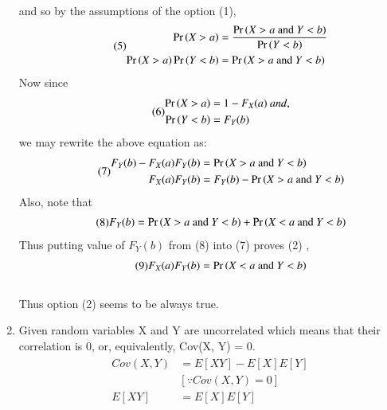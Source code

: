 \documentclass[journal,12pt,twocolumn]{IEEEtran}
\begin{document}
\begin{enumerate}
and so by the assumptions of the option (1),
\begin{align}\tag{5}
    \begin{split}
        \Pr\left(X > a\right) &= \frac{\Pr\left(X > a \mbox{ and } Y < b\right)}{\Pr\left(Y < b\right)}\\
        \Pr\left(X > a\right)\Pr\left(Y < b\right) &= \Pr\left(X > a \mbox{ and } Y < b\right)
    \end{split}
\end{align}
Now since 
\begin{align}\tag{6}
    \begin{split}
        \Pr\left(X > a\right) &= 1 - F_X(a)\ and,\\
        \Pr\left(Y < b\right) &= F_Y(b)
    \end{split}
\end{align}
we may rewrite the above equation as:
\begin{align}\tag{7}
    \begin{split}
        F_Y(b) - F_X(a)F_Y(b) &= \Pr\left(X > a \mbox{ and } Y < b\right)\\
        F_X(a)F_Y(b) &= F_Y(b) - \Pr\left(X > a \mbox{ and } Y < b\right)
    \end{split}
\end{align}
Also, note that 
\begin{align}\tag{8}
    \begin{split}
        F_Y(b) = \Pr\left(X > a \mbox{ and } Y < b\right) + \Pr\left(X < a \mbox{ and } Y < b\right)
    \end{split}
\end{align}
Thus putting value of $F_Y(b)$ from (8) into (7) proves (2) ,
\begin{align}\tag{9}
    \begin{split}
        F_X(a)F_Y(b) &= \Pr\left(X < a \mbox{ and } Y < b\right)\\
    \end{split}
\end{align}\\
Thus option (2) seems to be always true.\\
    \item Given random variables X and Y are uncorrelated which means that their correlation is 0, or, equivalently, Cov(X, Y) = 0.\\
\begin{align}\tag{10}
    \begin{split}
        Cov(X, Y) &= E[XY] - E[X]E[Y]\\
        &[\because Cov(X, Y) = 0]\\
        E[XY] &= E[X]E[Y]
    \end{split}
\end{align}


\end{enumerate}
\end{document}
